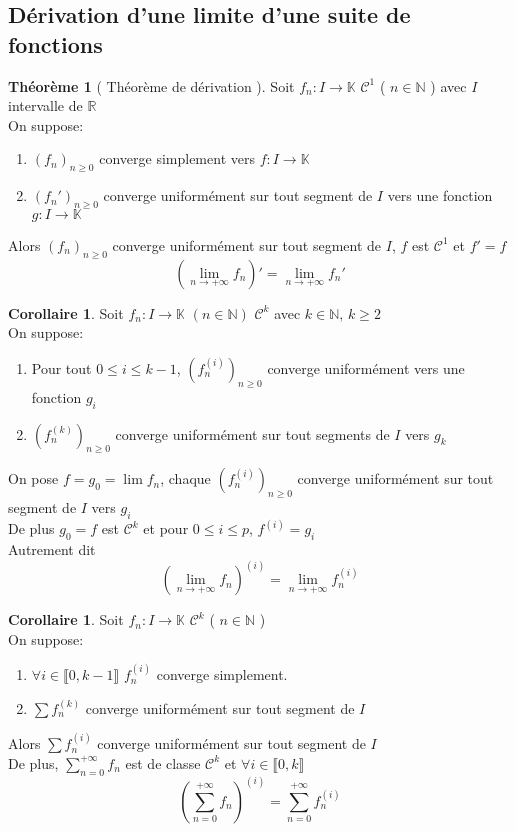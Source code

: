 \documentclass[10pt,a4paper]{article}
\theoremstyle{definition}
\newtheorem{theorem}[proposition]{Théorème}
\newtheorem{corollaire}[proposition]{Corollaire}
\begin{document}
\subsection{Dérivation d'une limite d'une suite de fonctions}
\begin{theorem}[ Théorème de dérivation ]
    Soit $f_n: I \to \mathbb{K}$ $\mathcal{C}^1$ ( $n \in \mathbb{N}$ ) avec $I$ intervalle de $\mathbb{R}$ \\
    On suppose:
    \begin{enumerate}
        \item $(f_n)_{n \geq 0}$ converge simplement vers $f: I \to \mathbb{K}$
        \item $(f_n')_{n \geq 0}$ converge uniformément sur tout segment de $I$ vers une fonction $g: I \to \mathbb{K}$
    \end{enumerate}
    Alors $(f_n)_{n \geq 0}$ converge uniformément sur tout segment de $I$, $f$ est $\mathcal{C}^1$ et $f' = f$
    \[\left(\lim_{n \to +\infty} f_n\right)' = \lim_{n \to +\infty} f_n'\]
\end{theorem}
\begin{corollaire}
    Soit \(f_n: I \to \mathbb{K}\) \((n \in \mathbb{N})\) \(\mathcal{C}^k\) avec \(k \in \mathbb{N},\, k \geq 2\) \\
    On suppose:
    \begin{enumerate}
        \item Pour tout \(0 \leq i \leq k - 1\), \(\left(f_n^{(i)}\right)_{n \geq 0}\) converge uniformément vers une fonction \(g_i\)
        \item \(\left(f_n^{(k)}\right)_{n \geq 0}\) converge uniformément sur tout segments de \(I\) vers \(g_k\)
    \end{enumerate}
    On pose \(f = g_0 = \lim f_n\), chaque \(\left(f_n^{(i)}\right)_{n \geq 0}\) converge uniformément sur tout segment de \(I\) vers \(g_i\) \\
    De plus \(g_0 = f\) est \(\mathcal{C}^k\) et pour \(0 \leq i \leq p\), \(f^{(i)} = g_i\) \\
    Autrement dit
    \[\boxed{\left(\lim_{n \to +\infty} f_n\right)^{(i)} = \lim_{n \to +\infty} f_n^{(i)}}\]
\end{corollaire}
\begin{corollaire}
    Soit $f_n: I \to \mathbb{K}$ $\mathcal{C}^k$ ( $n \in \mathbb{N}$ ) \\
    On suppose:
    \begin{enumerate}
        \item $\forall i \in \llbracket 0, k-1 \rrbracket$ $f_n^{(i)}$ converge simplement.
        \item $\sum f_n^{(k)}$ converge uniformément sur tout segment de $I$
    \end{enumerate}
    Alors $\sum f_n^{(i)}$ converge uniformément sur tout segment de $I$ \\
    De plus, $\sum\limits_{n = 0}^{+\infty} f_n$ est de classe $\mathcal{C}^k$ et $\forall i \in \llbracket 0, k \rrbracket$
    \[\boxed{\left(\sum_{n = 0}^{+\infty}f_n\right)^{(i)} = \sum_{n = 0}^{+\infty}f_n^{(i)}}\]
\end{corollaire}
\end{document}
